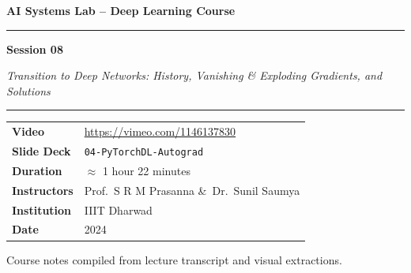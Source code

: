 \documentclass[12pt,a4paper]{article}
\begin{document}
\begin{titlepage}
  \centering
  \vspace*{2cm}
  {\Large\bfseries AI Systems Lab -- Deep Learning Course\par}
  \vspace{0.5cm}
  \rule{\linewidth}{1pt}
  \vspace{0.5cm}

  {\LARGE\bfseries Session 08\par}
  \vspace{0.3cm}
  {\large\itshape Transition to Deep Networks: History, Vanishing \&
   Exploding Gradients, and Solutions\par}

  \vspace{0.5cm}
  \rule{\linewidth}{1pt}
  \vspace{1cm}

  \begin{tabular}{ll}
    \textbf{Video}       & \url{https://vimeo.com/1146137830} \\[4pt]
    \textbf{Slide Deck}  & \texttt{04-PyTorchDL-Autograd} \\[4pt]
    \textbf{Duration}    & $\approx$ 1 hour 22 minutes \\[4pt]
    \textbf{Instructors} & Prof.\ S R M Prasanna \&\ Dr.\ Sunil Saumya \\[4pt]
    \textbf{Institution} & IIIT Dharwad \\[4pt]
    \textbf{Date}        & 2024 \\
  \end{tabular}

  \vspace{1.5cm}

  \begin{abstract}
    \noindent
    Session~8 marks the pivotal transition from shallow artificial neural
    networks (ANNs) to deep networks.  The lecture opens by recapping the
    historical arc from the single-layer perceptron through the
    multi-layer perceptron (MLP) and backpropagation, then explains the
    six converging factors that enabled the modern deep learning
    resurgence after the ``AI winter'' of the late 1990s.  The central
    topic is the \emph{vanishing/exploding gradient problem} (VGP/EGP):
    why sigmoid activations cause gradients to shrink exponentially as
    they propagate backwards through many layers, stalling learning in
    early layers.  A concrete four-layer numerical walkthrough
    demonstrates the phenomenon.  The session concludes with a
    three-step solution framework: (1)~identify the gradient problem,
    (2)~explore weight initialisation (greedy layer-wise unsupervised
    pre-training), and (3)~replace sigmoid with the Rectified Linear
    Unit (ReLU), whose constant derivative of~1 eliminates gradient
    decay.
  \end{abstract}

  \vfill
  {\small Course notes compiled from lecture transcript and visual
  extractions.}
\end{titlepage}
\end{document}
